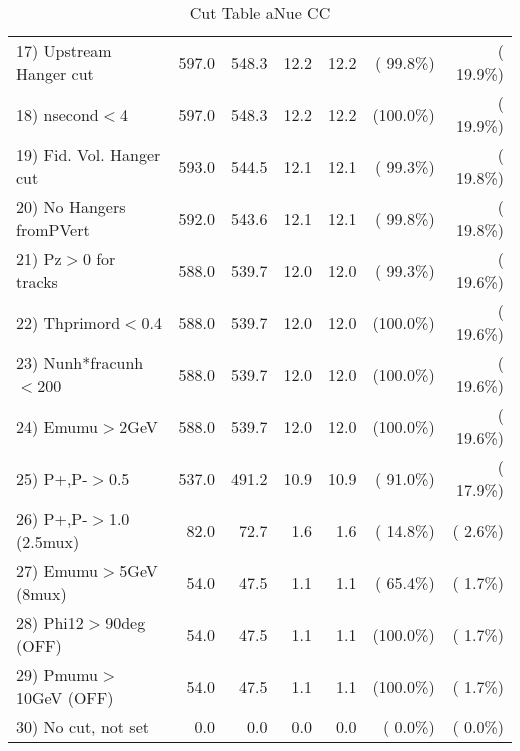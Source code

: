 \begin{table}[h!]
\begin{tabular}{||l||r|r|r|r|r|r||}
 17) Upstream Hanger cut  &        597.0 &        548.3 &         12.2 &         12.2 & ( 99.8\%) & ( 19.9\%) \\
 18) nsecond$<$4          &        597.0 &        548.3 &         12.2 &         12.2 & (100.0\%) & ( 19.9\%) \\
 19) Fid. Vol. Hanger cut &        593.0 &        544.5 &         12.1 &         12.1 & ( 99.3\%) & ( 19.8\%) \\
 20) No Hangers fromPVert &        592.0 &        543.6 &         12.1 &         12.1 & ( 99.8\%) & ( 19.8\%) \\
 21) Pz$>$0 for tracks    &        588.0 &        539.7 &         12.0 &         12.0 & ( 99.3\%) & ( 19.6\%) \\
 22) Thprimord$<$0.4      &        588.0 &        539.7 &         12.0 &         12.0 & (100.0\%) & ( 19.6\%) \\
 23) Nunh*fracunh$<$200   &        588.0 &        539.7 &         12.0 &         12.0 & (100.0\%) & ( 19.6\%) \\
 24) Emumu$>$2GeV         &        588.0 &        539.7 &         12.0 &         12.0 & (100.0\%) & ( 19.6\%) \\
 25) P+,P-$>$0.5          &        537.0 &        491.2 &         10.9 &         10.9 & ( 91.0\%) & ( 17.9\%) \\
 26) P+,P-$>$1.0 (2.5mux) &         82.0 &         72.7 &          1.6 &          1.6 & ( 14.8\%) & (  2.6\%) \\
 27) Emumu$>$5GeV  (8mux) &         54.0 &         47.5 &          1.1 &          1.1 & ( 65.4\%) & (  1.7\%) \\
 28) Phi12$>$90deg  (OFF) &         54.0 &         47.5 &          1.1 &          1.1 & (100.0\%) & (  1.7\%) \\
 29) Pmumu$>$10GeV  (OFF) &         54.0 &         47.5 &          1.1 &          1.1 & (100.0\%) & (  1.7\%) \\
 30) No cut, not set      &          0.0 &          0.0 &          0.0 &          0.0 & (  0.0\%) & (  0.0\%) \\
 \hline
 \hline
 \end{tabular}
 \caption{Cut Table  aNue CC  }
 \label{tab-cutheavy_neutrino_3.000}
 \end{table}
